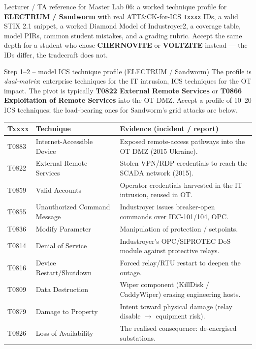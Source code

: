 \documentclass[11pt,a4paper]{article}
\begin{document}
\labheader

\begin{goalbox}
Lecturer / TA reference for Master Lab 06: a worked technique profile for
\textbf{ELECTRUM / Sandworm} with real ATT\&CK-for-ICS \texttt{Txxxx} IDs, a
valid STIX 2.1 snippet, a worked Diamond Model of Industroyer2, a coverage
table, model PIRs, common student mistakes, and a grading rubric. Accept the
same depth for a student who chose \textbf{CHERNOVITE} or \textbf{VOLTZITE}
instead --- the IDs differ, the tradecraft does not.
\end{goalbox}

\begin{solutionbox}{Step 1--2 -- model ICS technique profile (ELECTRUM / Sandworm)}
The profile is \emph{dual-matrix}: enterprise techniques for the IT intrusion,
ICS techniques for the OT impact. The pivot is typically \textbf{T0822 External
Remote Services} or \textbf{T0866 Exploitation of Remote Services} into the OT
DMZ. Accept a profile of 10--20 ICS techniques; the load-bearing ones for
Sandworm's grid attacks are below.

\begin{center}\footnotesize
\begin{tabular}{@{}p{2.0cm}p{4.0cm}p{8.2cm}@{}}
\toprule
\textbf{Txxxx} & \textbf{Technique} & \textbf{Evidence (incident / report)} \\
\midrule
T0883 & Internet-Accessible Device   & Exposed remote-access pathways into the OT DMZ (2015 Ukraine). \\
T0822 & External Remote Services     & Stolen VPN/RDP credentials to reach the SCADA network (2015). \\
T0859 & Valid Accounts               & Operator credentials harvested in the IT intrusion, reused in OT. \\
T0855 & Unauthorized Command Message & Industroyer issues breaker-open commands over IEC-101/104, OPC. \\
T0836 & Modify Parameter             & Manipulation of protection / setpoints. \\
T0814 & Denial of Service            & Industroyer's OPC/SIPROTEC DoS module against protective relays. \\
T0816 & Device Restart/Shutdown      & Forced relay/RTU restart to deepen the outage. \\
T0809 & Data Destruction             & Wiper component (KillDisk / CaddyWiper) erasing engineering hosts. \\
T0879 & Damage to Property           & Intent toward physical damage (relay disable $\to$ equipment risk). \\
T0826 & Loss of Availability         & The realised consequence: de-energised substations. \\
\bottomrule
\end{tabular}
\end{center}


\end{solutionbox}
\end{document}
